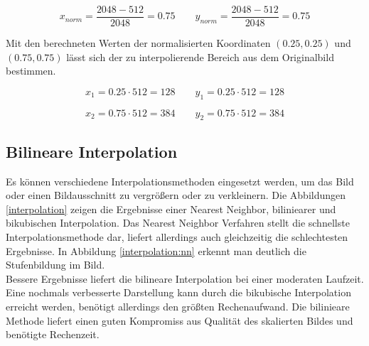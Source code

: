 \begin{equation}
 x_{norm} = \frac{2048 - 512}{2048} = 0.75\qquad
 y_{norm} = \frac{2048 - 512}{2048} = 0.75
\end{equation}

Mit den berechneten Werten der normalisierten Koordinaten $(0.25, 0.25)$ und $(0.75, 0.75)$ lässt sich der zu interpolierende Bereich aus dem Originalbild bestimmen.

\begin{equation}
 x_1 = 0.25 \cdot 512 =  128\qquad
 y_1 = 0.25 \cdot 512 =  128
\end{equation}

\begin{equation}
 x_2 = 0.75 \cdot 512 =  384\qquad
 y_2 = 0.75 \cdot 512 =  384
\end{equation}

\subsection{Bilineare Interpolation}

Es können verschiedene Interpolationsmethoden eingesetzt werden, um das Bild oder einen Bildausschnitt zu vergrößern oder zu verkleinern. Die Abbildungen \ref{interpolation} zeigen die Ergebnisse einer Nearest Neighbor, biliniearer und bikubischen Interpolation. Das Nearest Neighbor Verfahren stellt die schnellste Interpolationsmethode dar, liefert allerdings auch gleichzeitig die schlechtesten Ergebnisse. In Abbildung \ref{interpolation:nn} erkennt man deutlich die Stufenbildung im Bild.\\
Bessere Ergebnisse liefert die bilineare Interpolation bei einer moderaten Laufzeit. Eine nochmals verbesserte Darstellung kann durch die bikubische Interpolation erreicht werden, benötigt allerdings den größten Rechenaufwand. Die bilinieare Methode liefert einen guten Kompromiss aus Qualität des skalierten Bildes und benötigte Rechenzeit.

